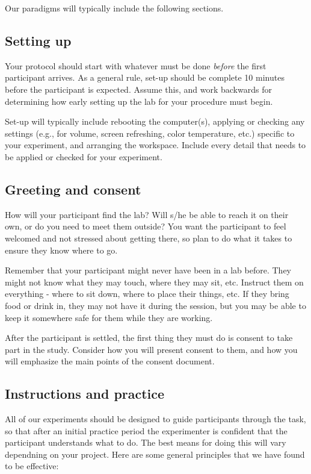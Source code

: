 \documentclass[12pt,]{book}
\theoremstyle{definition}
\theoremstyle{definition}
\theoremstyle{definition}
\theoremstyle{remark}
\begin{document}
Our paradigms will typically include the following sections.

\subsection{Setting up}\label{setting-up}

Your protocol should start with whatever must be done \emph{before} the
first participant arrives. As a general rule, set-up should be complete
10 minutes before the participant is expected. Assume this, and work
backwards for determining how early setting up the lab for your
procedure must begin.

Set-up will typically include rebooting the computer(s), applying or
checking any settings (e.g., for volume, screen refreshing, color
temperature, etc.) specific to your experiment, and arranging the
workspace. Include every detail that needs to be applied or checked for
your experiment.

\subsection{Greeting and consent}\label{greeting-and-consent}

How will your participant find the lab? Will s/he be able to reach it on
their own, or do you need to meet them outside? You want the participant
to feel welcomed and not stressed about getting there, so plan to do
what it takes to ensure they know where to go.

Remember that your participant might never have been in a lab before.
They might not know what they may touch, where they may sit, etc.
Instruct them on everything - where to sit down, where to place their
things, etc. If they bring food or drink in, they may not have it during
the session, but you may be able to keep it somewhere safe for them
while they are working.

After the participant is settled, the first thing they must do is
consent to take part in the study. Consider how you will present consent
to them, and how you will emphasize the main points of the consent
document.

\subsection{Instructions and practice}\label{instructions-and-practice}

All of our experiments should be designed to guide participants through
the task, so that after an initial practice period the experimenter is
confident that the participant understands what to do. The best means
for doing this will vary dependning on your project. Here are some
general principles that we have found to be effective:
\end{document}
